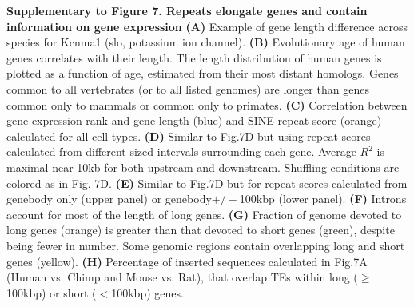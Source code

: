 \textbf{Supplementary to Figure 7. Repeats elongate genes and contain information on gene expression}
\textbf{(A)} Example of gene length difference across species for Kcnma1 (slo, potassium ion channel). 
\textbf{(B)} Evolutionary age of human genes correlates with their length. The length distribution of human genes is plotted as a function of age, estimated from their most distant homologs. Genes common to all vertebrates (or to all listed genomes) are longer than genes common only to mammals or common only to primates.
\textbf{(C)} Correlation between gene expression rank and gene length (blue) and SINE repeat score (orange) calculated for all cell types. 
\textbf{(D)} Similar to Fig.7D but using repeat scores calculated from different sized intervals surrounding each gene. Average $R^2$ is maximal near 10kb for both upstream and downstream. Shuffling conditions are colored as in Fig. 7D.
\textbf{(E)} Similar to Fig.7D but for repeat scores calculated from genebody only (upper panel) or genebody$+/-$100kbp (lower panel).
\textbf{(F)} Introns account for most of the length of long genes. 
\textbf{(G)} Fraction of genome devoted to long genes (orange) is greater than that devoted to short genes (green), despite being fewer in number. Some genomic regions contain overlapping long and short genes (yellow).
\textbf{(H)} Percentage of inserted sequences calculated in Fig.7A (Human vs. Chimp and Mouse vs. Rat), that overlap TEs within long ($\geq$ 100kbp) or short ($<$100kbp) genes. 
